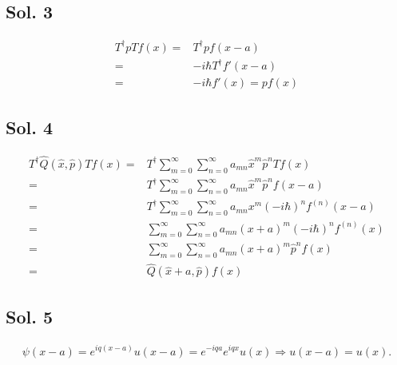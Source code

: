 \subsection*{Sol. 3}
\begin{align*}
    T^\dagger pT f(x) = & 
    T^\dagger pf(x-a)\\
    =&-i\hbar T^\dagger f'(x-a)\\
    =&-i\hbar f'(x) = pf(x)
\end{align*}

\subsection*{Sol. 4}
\begin{align*}
    T^\dagger\hat Q(\hat x, \hat p)Tf(x)
    =
    &T^\dagger\sum_{m=0}^\infty\sum_{n=0}^\infty a_{mn}\hat x^m\hat p ^nTf(x)\\
    =&T^\dagger\sum_{m=0}^\infty\sum_{n=0}^\infty a_{mn}\hat x^m\hat p ^nf(x-a)\\
    =&T^\dagger\sum_{m=0}^\infty\sum_{n=0}^\infty a_{mn}x^m(-i\hbar)^nf^{(n)}(x-a)\\
    =&\sum_{m=0}^\infty\sum_{n=0}^\infty a_{mn}(x+a)^m(-i\hbar)^nf^{(n)}(x)\\
    =&\sum_{m=0}^\infty\sum_{n=0}^\infty a_{mn}(x+a)^m\hat p ^nf(x)\\
    =& \hat Q(\hat x + a, \hat p)f(x)
\end{align*}

\subsection*{Sol. 5}
\begin{align*}
    \psi(x-a)=e^{iq(x-a)}u(x-a) = e^{-iqa}e^{iqx}u(x) \Rightarrow u(x-a)=u(x).
\end{align*}

